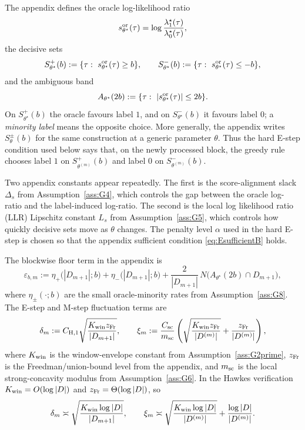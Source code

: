 \documentclass{statsoc}
\newcommand{\1}{\mathbbm{1}}
\begin{document}
The appendix defines the oracle log-likelihood ratio
\[
s^{\rm or}_{\theta^\star}(\tau)=\log\frac{\lambda_1^\star(\tau)}{\lambda_0^\star(\tau)},
\]
the decisive sets
\[
S_{\theta^\star}^+(b):=\{\tau:\ s^{\rm or}_{\theta^\star}(\tau)\ge b\},
\qquad
S_{\theta^\star}^-(b):=\{\tau:\ s^{\rm or}_{\theta^\star}(\tau)\le -b\},
\]
and the ambiguous band
\[
A_{\theta^\star}(2b):=\{\tau:\ |s^{\rm or}_{\theta^\star}(\tau)|\le 2b\}.
\]
On \(S_{\theta^\star}^+(b)\) the oracle favours label \(1\), and on \(S_{\theta^\star}^-(b)\) it favours label \(0\); a \emph{minority label} means the opposite choice. More generally, the appendix writes \(S_\theta^\pm(b)\) for the same construction at a generic parameter \(\theta\). Thus the hard E-step condition used below says that, on the newly processed block, the greedy rule chooses label \(1\) on \(S_{\theta^{(m)}}^+(b)\) and label \(0\) on \(S_{\theta^{(m)}}^-(b)\).

Two appendix constants appear repeatedly. The first is the score-alignment slack \(\Delta_s\) from Assumption~\ref{ass:G4}, which controls the gap between the oracle log-ratio and the label-induced log-ratio. The second is the local log likelihood ratio (LLR) Lipschitz constant \(L_s\) from Assumption~\ref{ass:G5}, which controls how quickly decisive sets move as \(\theta\) changes. The penalty level \(\alpha\) used in the hard E-step is chosen so that the appendix sufficient condition \eqref{eq:EsufficientB} holds.

The blockwise floor term in the appendix is
\[
\varepsilon_{b,m}
:=
\eta_+\bigl(|D_{m+1}|;b\bigr)
+
\eta_-\bigl(|D_{m+1}|;b\bigr)
+
\frac{2}{|D_{m+1}|}\,
N\!\big(A_{\theta^\star}(2b)\cap D_{m+1}\big),
\]
where \(\eta_\pm(\cdot;b)\) are the small oracle-minority rates from Assumption~\ref{ass:G8}. The E-step and M-step fluctuation terms are
\[
\delta_m
:=
C_{\rm H,1}\sqrt{\frac{K_{\rm win}z_{\rm Fr}}{|D_{m+1}|}},
\qquad
\xi_m
:=
\frac{C_{\rm sc}}{m_{\rm sc}}
\left(
\sqrt{\frac{K_{\rm win}z_{\rm Fr}}{|D^{(m)}|}}
+
\frac{z_{\rm Fr}}{|D^{(m)}|}
\right),
\]
where \(K_{\rm win}\) is the window-envelope constant from Assumption~\ref{ass:G2prime}, \(z_{\rm Fr}\) is the Freedman/union-bound level from the appendix, and \(m_{\rm sc}\) is the local strong-concavity modulus from Assumption~\ref{ass:G6}. In the Hawkes verification \(K_{\rm win}=O(\log|D|)\) and \(z_{\rm Fr}=\Theta(\log|D|)\), so
\[
\delta_m\asymp \sqrt{\frac{K_{\rm win}\log |D|}{|D_{m+1}|}},
\qquad
\xi_m\asymp \sqrt{\frac{K_{\rm win}\log |D|}{|D^{(m)}|}}+\frac{\log|D|}{|D^{(m)}|}.
\]
\end{document}
